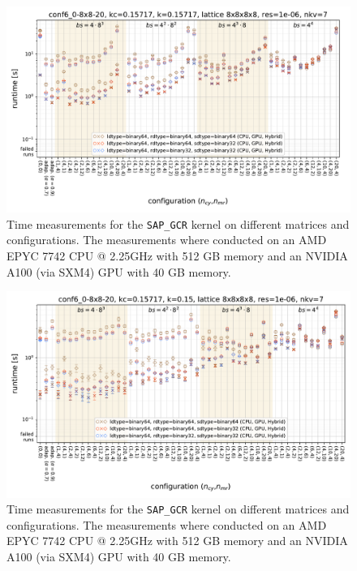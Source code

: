 \documentclass{article}
\theoremstyle{plain} %
\theoremstyle{convention} %
\theoremstyle{remark} %
\def\code#1{\texttt{#1}}
\numberwithin{equation}{section}
\begin{document}
\begin{figure}[h]
    \centering
    \includegraphics[width=1.0\textwidth]{plots/sap_gcr_conf6_0-8x8-20_kc=0.15717_k=0.15717_lattice_8x8x8x8_res=1e-06_nkv=7}
    \caption{Time measurements for the \code{SAP\_GCR} kernel on different matrices and configurations. The measurements where conducted on an AMD EPYC 7742 CPU @ 2.25GHz with 512 GB memory and an NVIDIA A100 (via SXM4) GPU with 40 GB memory.}
    \label{fig:sap_gcr1}
    \label{fig:sap_gcr_conf6_0-8x8-20_0.15717}
\end{figure}

\begin{figure}[h]
    \centering
    \includegraphics[width=1.0\textwidth]{plots/sap_gcr_conf6_0-8x8-20_kc=0.15717_k=0.15_lattice_8x8x8x8_res=1e-06_nkv=7}
    \caption{Time measurements for the \code{SAP\_GCR} kernel on different matrices and configurations. The measurements where conducted on an AMD EPYC 7742 CPU @ 2.25GHz with 512 GB memory and an NVIDIA A100 (via SXM4) GPU with 40 GB memory.}
    \label{fig:sap_gcr2}
    \label{fig:sap_gcr_conf6_0-8x8-20_0.15}
\end{figure}
\end{document}
